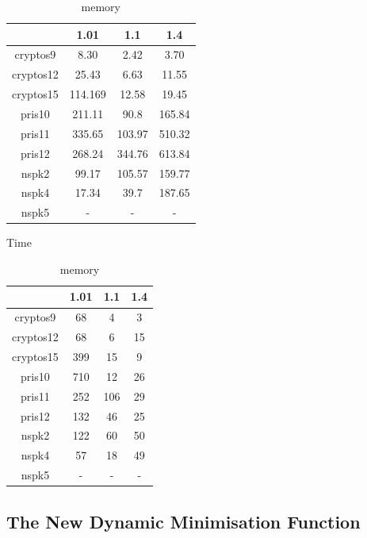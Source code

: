 \documentclass[11pt]{report}
\begin{document}
\begin{table}
\centering
\begin{tabular}{|*{4}{c|}}
\hline
 &1.01 & 1.1 & 1.4 \\ \hline
cryptos9 & 8.30 & 2.42 & 3.70 \\ \hline
cryptos12  & 25.43 & 6.63 & 11.55 \\ \hline
cryptos15 & 114.169 & 12.58 & 19.45 \\ \hline
pris10 & 211.11 & 90.8 &165.84  \\ \hline
pris11 & 335.65 & 103.97 & 510.32 \\ \hline
pris12 & 268.24 & 344.76 & 613.84\\ \hline
nspk2 & 99.17 & 105.57 & 159.77 \\ \hline
nspk4 & 17.34 & 39.7 & 187.65 \\ \hline
nspk5 & - & -&  -\\ \hline
\end{tabular}
\caption{Time}
\label{table:newconftime}
\vspace{1in}
\centering
\begin{tabular}{|*{4}{c|}}
\hline
 &1.01 & 1.1 & 1.4 \\ \hline
cryptos9 & 68 & 4 & 3 \\ \hline
cryptos12 & 68 &6 & 15 \\ \hline
cryptos15 & 399 &15& 9 \\ \hline
pris10 & 710 & 12 & 26 \\ \hline
pris11 & 252 & 106  &  29 \\ \hline
pris12 & 132 &46 & 25 \\ \hline
nspk2 & 122 & 60 & 50 \\ \hline
nspk4 & 57 & 18 & 49\\ \hline
nspk5 & - & - & -\\ \hline
\end{tabular}
\caption{memory}
\label{table:newconfmemory}
\end{table}



\subsection{The New Dynamic Minimisation Function}
\end{document}
